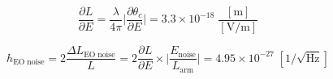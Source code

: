 \begin{equation*}
    \frac{\partial L}{\partial E} = \frac{\lambda}{4 \pi} \bigg| \frac{\partial \theta_c}{\partial E} \bigg| = 3.3 \times 10^{-18} \; \frac{[\mathrm{m}]}{[\mathrm{V/m}]}
\end{equation*}

\begin{equation}
    h_\mathrm{EO\; noise} = 2\frac{\Delta L_\mathrm{EO \; noise}}{L} = 2\frac{\partial L}{\partial E} \times \bigg| \frac{E_\mathrm{noise}}{L_\mathrm{arm}} \bigg| = 4.95 \times 10^{-27} \; [1/ \sqrt{\mathrm{Hz}}]
\end{equation}

